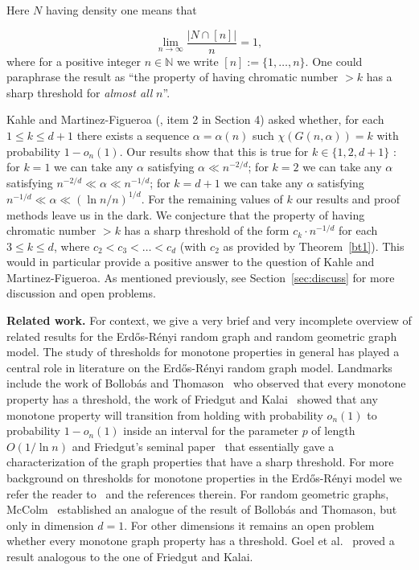 \documentclass[11pt]{article}%
\newcommand{\eN}[0]{\ensuremath{ \mathbb N}}
\begin{document}
\noindent
Here $N$ having density one means that 

$$ \lim_{n\to\infty} \frac{|N \cap [n]|}{n} = 1, $$
where for a positive integer $n \in \eN$ we write $[n] := \{1,\dots, n\}$.
One could paraphrase the result as 
``the property of having chromatic number $> k$ has a sharp threshold for {\em almost all} $n$''. 

Kahle and Martinez-Figueroa (\cite{KahleFig}, item 2 in Section 4) asked whether, for each $1\leq k \leq d+1$ there exists a
sequence $\alpha=\alpha(n)$ such $\chi( G(n,\alpha) ) = k$ with probability $1-o_n(1)$.
Our results show that this is true for $k \in \{1,2,d+1\}$ :
for $k=1$ we can take any $\alpha$ satisfying $\alpha \ll n^{-2/d}$;
for $k=2$ we can take any $\alpha$ satisfying $n^{-2/d} \ll \alpha \ll n^{-1/d}$; 
for $k=d+1$ we can take any $\alpha$ satisfying $n^{-1/d} \ll \alpha \ll (\ln n/n)^{1/d}$.
For the remaining values of $k$ our results and proof methods leave us in the dark.
We conjecture that the property of having chromatic number $> k$ has a sharp threshold 
of the form $c_k \cdot n^{-1/d}$ for each $3\leq k \leq d$, where $c_2<c_3<\dots<c_{d}$ (with $c_2$ 
as provided by Theorem~\ref{bt1}). 
This would in particular provide a positive answer to the question of Kahle and Martinez-Figueroa.
As mentioned previously, see Section~\ref{sec:discuss} for more discussion and open problems.

\vspace{1ex}

{\bf Related work.} For context, we give a very brief and very incomplete overview of related results for 
the Erd\H{o}s-R\'enyi random graph and random geometric graph model.
The study of thresholds for monotone properties in general has played a
central role in literature on the Erd\H{o}s-R\'enyi random graph model.
Landmarks include the work of Bollob\'as and Thomason~\cite{BollobasThomason87} who 
observed that every monotone property has a threshold, the work of
Friedgut and Kalai~\cite{FriedgutKalai96} showed that any monotone property will transition from 
holding with probability $o_n(1)$ to probability $1-o_n(1)$ inside an interval for the parameter $p$
of length $O(1/\ln n)$ and Friedgut's seminal paper~\cite{Friedgut99} that essentially gave a characterization of the 
graph properties that have a sharp threshold. 
For more background on thresholds for monotone properties in the Erd\H{o}s-R\'enyi model 
we refer the reader to~\cite{Friedgut_hunting,Perkins_survey} and the references therein.
For random geometric graphs, McColm~\cite{McColm_threshold} established an analogue of the result of Bollob\'as and Thomason, but 
only in dimension $d=1$. For other dimensions it remains an open problem whether every 
monotone graph property has a threshold. Goel et al.~\cite{GoelEtal} proved a result analogous to the one 
of Friedgut and Kalai. 
\end{document}
